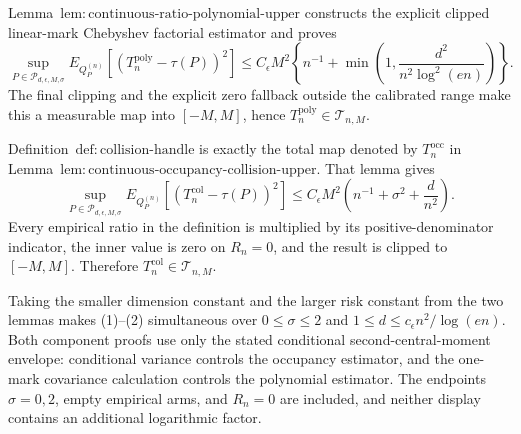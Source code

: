 Lemma~\(\mathrm{lem:continuous\text{-}ratio\text{-}polynomial\text{-}upper}\) constructs the explicit clipped linear-mark Chebyshev factorial estimator and proves
\[
 \sup_{P\in\mathcal P_{d,\epsilon,M,\sigma}}
 E_{Q_P^{(n)}}[(T_n^{\mathrm{poly}}-\tau(P))^2]
 \le C_{\epsilon}M^2\left\{n^{-1}+\min\left(1,
 \frac{d^2}{n^2\log^2(en)}\right)\right\}.
\tag{1}
\]
The final clipping and the explicit zero fallback outside the calibrated range make this a measurable map into \([-M,M]\), hence \(T_n^{\mathrm{poly}}\in\mathcal T_{n,M}\).

Definition~\(\mathrm{def:collision\text{-}handle}\) is exactly the total map denoted by \(T_n^{\mathrm{occ}}\) in Lemma~\(\mathrm{lem:continuous\text{-}occupancy\text{-}collision\text{-}upper}\).  That lemma gives
\[
 \sup_{P\in\mathcal P_{d,\epsilon,M,\sigma}}
 E_{Q_P^{(n)}}[(T_n^{\mathrm{col}}-\tau(P))^2]
 \le C_{\epsilon}M^2\left(n^{-1}+\sigma^2+\frac d{n^2}\right).
\tag{2}
\]
Every empirical ratio in the definition is multiplied by its positive-denominator indicator, the inner value is zero on \(R_n=0\), and the result is clipped to \([-M,M]\).  Therefore \(T_n^{\mathrm{col}}\in\mathcal T_{n,M}\).

Taking the smaller dimension constant and the larger risk constant from the two lemmas makes (1)--(2) simultaneous over \(0\le\sigma\le2\) and \(1\le d\le c_\epsilon n^2/\log(en)\).  Both component proofs use only the stated conditional second-central-moment envelope: conditional variance controls the occupancy estimator, and the one-mark covariance calculation controls the polynomial estimator.  The endpoints \(\sigma=0,2\), empty empirical arms, and \(R_n=0\) are included, and neither display contains an additional logarithmic factor.